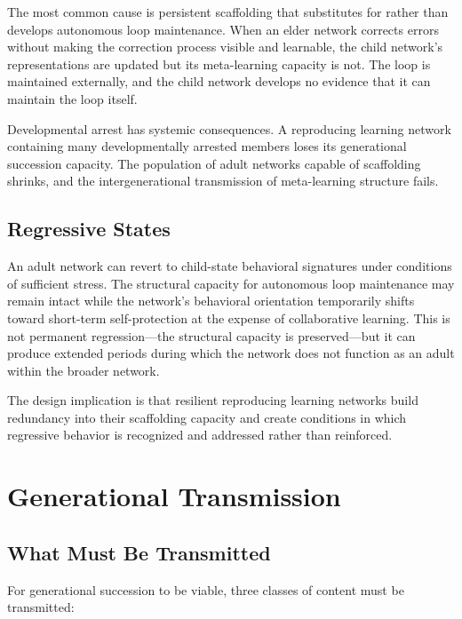 \documentclass[11pt]{article}
\begin{document}
The most common cause is persistent scaffolding that substitutes for rather than develops
autonomous loop maintenance. When an elder network corrects errors without making the
correction process visible and learnable, the child network's representations are updated but its
meta-learning capacity is not. The loop is maintained externally, and the child network develops
no evidence that it can maintain the loop itself.

Developmental arrest has systemic consequences. A reproducing learning network containing many
developmentally arrested members loses its generational succession capacity. The population of
adult networks capable of scaffolding shrinks, and the intergenerational transmission of
meta-learning structure fails.

\subsection{Regressive States}

An adult network can revert to child-state behavioral signatures under conditions of sufficient
stress. The structural capacity for autonomous loop maintenance may remain intact while the
network's behavioral orientation temporarily shifts toward short-term self-protection at the
expense of collaborative learning. This is not permanent regression---the structural capacity
is preserved---but it can produce extended periods during which the network does not function
as an adult within the broader network.

The design implication is that resilient reproducing learning networks build redundancy into
their scaffolding capacity and create conditions in which regressive behavior is recognized and
addressed rather than reinforced.

\section{Generational Transmission}

\subsection{What Must Be Transmitted}

For generational succession to be viable, three classes of content must be transmitted:
\end{document}
